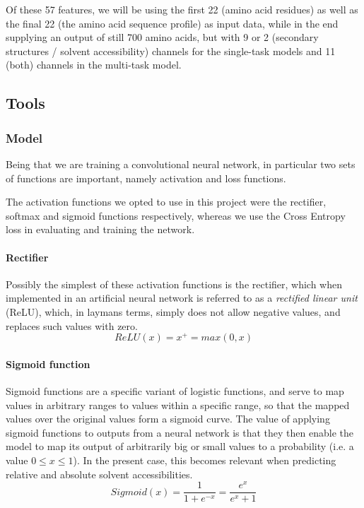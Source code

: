 \begin{multicols}{2}
\begin{Figure}
 \captionsetup{width=0.8\linewidth, font=small}
\end{Figure}
\noindent Of these 57 features, we will be using the first 22 (amino acid residues) as well as the final 22 (the amino acid sequence profile) as input data, while in the end supplying an output of still 700 amino acids, but with 9 or 2 (secondary structures / solvent accessibility) channels for the single-task models and 11 (both) channels in the multi-task model.


\subsection{Tools}
\subsubsection{Model}
Being that we are training a convolutional neural network, in particular two sets of functions are important, namely activation and loss functions.

The activation functions we opted to use in this project were the rectifier, softmax and sigmoid functions respectively, whereas we use the Cross Entropy loss in evaluating and training the network.
\paragraph{Rectifier}
Possibly the simplest of these activation functions is the rectifier, which when implemented in an artificial neural network is referred to as a \textit{rectified linear unit} (ReLU), which, in laymans terms, simply does not allow negative values, and replaces such values with zero.
\[
ReLU(x) = x^+ = max(0,x)
\]

\paragraph{Sigmoid function}
Sigmoid functions are a specific variant of logistic functions, and serve to map values in arbitrary ranges to values within a specific range, so that the mapped values over the original values form a sigmoid curve. The value of applying sigmoid functions to outputs from a neural network is that they then enable the model to map its output of arbitrarily big or small values to a probability (i.e. a value $0\leq x \leq 1$). In the present case, this becomes relevant when predicting relative and absolute solvent accessibilities.
\[
Sigmoid(x) = \frac{1}{1 + e^{-x}} = \frac{e^x}{e^x +1}
\]


\end{multicols}
